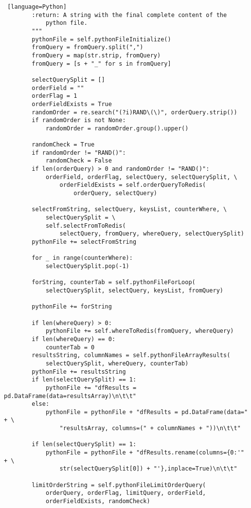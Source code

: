 \documentclass[11pt]{article}
\begin{document}
\begin{lstlisting} [language=Python]
        :return: A string with the final complete content of the
            python file.
        """
        pythonFile = self.pythonFileInitialize()
        fromQuery = fromQuery.split(",")
        fromQuery = map(str.strip, fromQuery)
        fromQuery = [s + "_" for s in fromQuery]

        selectQuerySplit = []
        orderField = ""
        orderFlag = 1
        orderFieldExists = True
        randomOrder = re.search("(?i)RAND\(\)", orderQuery.strip())
        if randomOrder is not None:
            randomOrder = randomOrder.group().upper()

        randomCheck = True
        if randomOrder != "RAND()":
            randomCheck = False
        if len(orderQuery) > 0 and randomOrder != "RAND()":
            orderField, orderFlag, selectQuery, selectQuerySplit, \
                orderFieldExists = self.orderQueryToRedis(
                    orderQuery, selectQuery)

        selectFromString, selectQuery, keysList, counterWhere, \
            selectQuerySplit = \
            self.selectFromToRedis(
                selectQuery, fromQuery, whereQuery, selectQuerySplit)
        pythonFile += selectFromString

        for _ in range(counterWhere):
            selectQuerySplit.pop(-1)

        forString, counterTab = self.pythonFileForLoop(
            selectQuerySplit, selectQuery, keysList, fromQuery)

        pythonFile += forString

        if len(whereQuery) > 0:
            pythonFile += self.whereToRedis(fromQuery, whereQuery)
        if len(whereQuery) == 0:
            counterTab = 0
        resultsString, columnNames = self.pythonFileArrayResults(
            selectQuerySplit, whereQuery, counterTab)
        pythonFile += resultsString
        if len(selectQuerySplit) == 1:
            pythonFile += "dfResults = pd.DataFrame(data=resultsArray)\n\t\t"
        else:
            pythonFile = pythonFile + "dfResults = pd.DataFrame(data=" + \
                "resultsArray, columns=(" + columnNames + "))\n\t\t"

        if len(selectQuerySplit) == 1:
            pythonFile = pythonFile + "dfResults.rename(columns={0:'" + \
                str(selectQuerySplit[0]) + "'},inplace=True)\n\t\t"

        limitOrderString = self.pythonFileLimitOrderQuery(
            orderQuery, orderFlag, limitQuery, orderField,
            orderFieldExists, randomCheck)


\end{lstlisting}
\end{document}
